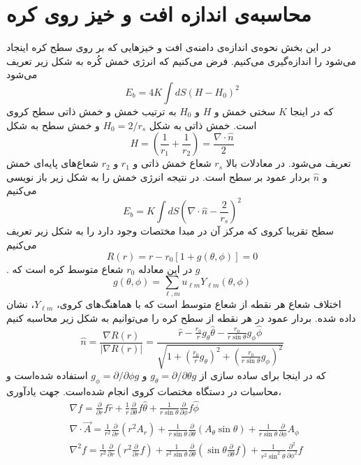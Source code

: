 \section{محاسبه‌ی اندازه افت و خیز روی کره}
در این بخش نحوه‌ی اندازه‌ی دامنه‌ی افت و خیزهایی که بر روی سطح کره اینجاد می‌شود را اندازه‌گیری می‌کنیم. 
\cite{safran1983}
فرض می‌کنیم که انرژی خمش کُره به شکل زیر تعریف می‌شود
\begin{equation}
E_{b}=4K\int dS\left(H-H_0\right)^2
\end{equation}
 که در اینجا 
 $K$
 سختی خمش و
 $H$
و 
$H_0$
به ترتیب خمش و خمش ذاتی سطح کروی است. خمش ذاتی به شکل 
$H_0=2/r_s$
و خمش سطح به شکل
\begin{equation}
H=\left(\frac{1}{r_1}+\frac{1}{r_2}\right)=\frac{\nabla\cdot\hat n}{2}
\end{equation}
تعریف می‌شود. در معادلات بالا 
$r_s$
شعاع خمش ذاتی و 
$r_1$ و $r_2$
شعاع‌های پایه‌ای خمش
و $\hat n$ بردار عمود بر سطح است. در نتیجه انرژی خمش را به شکل زیر باز نویسی می‌کنیم
\begin{equation}
E_{b}=K\int dS\left(\nabla\cdot\hat n-\frac{2}{r_s}\right)^2
\label{eq:ebforsubstitution}
\end{equation}
سطح تقریبا کروی که مرکز آن در مبدا مختصات وجود دارد را به شکل زیر تعریف می‌کنیم
\begin{equation}
R(r)= r-r_0\left[1+g(\theta,\phi)\right]=0
\label{eq:radiusdef}
\end{equation}
. در این معادله $r_0$ شعاع متوسط کره است که $g$
\begin{equation}
g(\theta,\phi)=\sum_{\ell,m}u_{\ell m}Y_{\ell m} (\theta,\phi)
\label{eq:gdef}
\end{equation}
اختلاف شعاع هر نقطه از شعاع متوسط است که با هماهنگ‌های کروی، $Y_{\ell m}$، نشان داده شده. بردار عمود در هر نقطه از سطح کره را می‌توانیم به شکل زیر محاسبه کنیم
\begin{equation}
\hat n = \frac{\nabla R(r)}{|\nabla R(r)|}= \frac{\hat r-\frac{r_0}{r}g_\theta \hat\theta-\frac{r_0}{r\sin\theta}g_\phi\hat\phi }{\sqrt{1+\left(\frac{r_0}{r}g_\theta\right)^2+\left(\frac{r_0}{r\sin\theta}g_\phi\right)^2 }}
\end{equation}
که در اینجا برای ساده سازی از
$g_\theta=\partial/\partial\theta g$
و
$g_\phi=\partial/\partial\phi g$
استفاده شده‌است و محاسبات در دستگاه مختصات کروی انجام شده‌است.
جهت یادآوری،
\begin{equation}
\begin{aligned}
&\nabla f =\frac{\partial}{\partial r}f\hat r + \frac{1}{r} \frac{\partial}{\partial\theta}f\hat\theta+ \frac{1}{r\sin\theta} \frac{\partial}{\partial\phi}f\hat\phi\\
&\nabla\cdot \vec A =\frac{1}{r^2}\frac{\partial}{\partial r}(r^2A_r)+ \frac{1}{r\sin\theta} \frac{\partial}{\partial\theta}(A_\theta\sin\theta)+ \frac{1}{r\sin\theta} \frac{\partial}{\partial\phi}A_\phi\\
&\nabla^2f =\frac{1}{r^2}\frac{\partial}{\partial r}\left(r^2\frac{\partial}{\partial r}f\right)+ \frac{1}{r^2\sin\theta} \frac{\partial}{\partial\theta}\left(\sin\theta\frac{\partial}{\partial\theta}f\right)+ \frac{1}{r^2\sin^2\theta} \frac{\partial^2}{\partial\phi^2}f
\end{aligned}
\end{equation}
